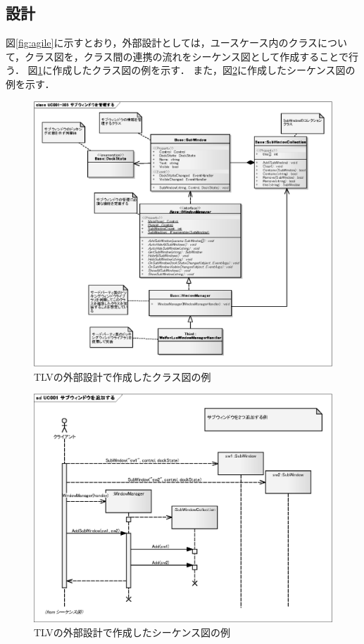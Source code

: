 \subsection{設計}

図\ref{fig:agile}に示すとおり，外部設計としては，ユースケース内のクラスについて，クラス図を，クラス間の連携の流れをシーケンス図として作成することで行う．
図\ref{fig:class}に作成したクラス図の例を示す．
また，図\ref{fig:sequence}に作成したシーケンス図の例を示す．

\begin{figure}[t]
\begin{center}
\includegraphics[width=13cm]{img/class.eps}
\caption{TLVの外部設計で作成したクラス図の例}
\label{fig:class}
\end{center}
\end{figure}

\begin{figure}[t]
\begin{center}
\includegraphics[width=13cm]{img/sequence.eps}
\caption{TLVの外部設計で作成したシーケンス図の例}
\label{fig:sequence}
\end{center}
\end{figure}

